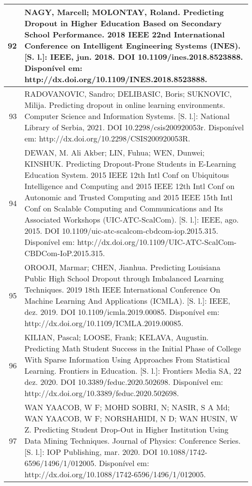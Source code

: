 \begin{apendicesenv}
\begin{longtable}[c]{|r|l|}
92 &
  \multicolumn{1}{p{14.5cm}|}{NAGY, Marcell; MOLONTAY, Roland. Predicting Dropout in Higher Education Based on Secondary School Performance. 2018 IEEE 22nd International Conference on Intelligent Engineering Systems (INES). {[}S. l.{]}: IEEE, jun. 2018. DOI 10.1109/ines.2018.8523888. Disponível em: http://dx.doi.org/10.1109/INES.2018.8523888.} \\ \hline
93 &
  \multicolumn{1}{p{14.5cm}|}{RADOVANOVIC, Sandro; DELIBASIC, Boris; SUKNOVIC, Milija. Predicting dropout in online learning environments. Computer Science and Information Systems. {[}S. l.{]}: National Library of Serbia, 2021. DOI 10.2298/csis200920053r. Disponível em: http://dx.doi.org/10.2298/CSIS200920053R.} \\ \hline
94 &
  \multicolumn{1}{p{14.5cm}|}{DEWAN, M. Ali Akber; LIN, Fuhua; WEN, Dunwei; KINSHUK. Predicting Dropout-Prone Students in E-Learning Education System. 2015 IEEE 12th Intl Conf on Ubiquitous Intelligence and Computing and 2015 IEEE 12th Intl Conf on Autonomic and Trusted Computing and 2015 IEEE 15th Intl Conf on Scalable Computing and Communications and Its Associated Workshops (UIC-ATC-ScalCom). {[}S. l.{]}: IEEE, ago. 2015. DOI 10.1109/uic-atc-scalcom-cbdcom-iop.2015.315. Disponível em: http://dx.doi.org/10.1109/UIC-ATC-ScalCom-CBDCom-IoP.2015.315.} \\ \hline
95 &
  \multicolumn{1}{p{14.5cm}|}{OROOJI, Marmar; CHEN, Jianhua. Predicting Louisiana Public High School Dropout through Imbalanced Learning Techniques. 2019 18th IEEE International Conference On Machine Learning And Applications (ICMLA). {[}S. l.{]}: IEEE, dez. 2019. DOI 10.1109/icmla.2019.00085. Disponível em: http://dx.doi.org/10.1109/ICMLA.2019.00085.} \\ \hline
96 &
  \multicolumn{1}{p{14.5cm}|}{KILIAN, Pascal; LOOSE, Frank; KELAVA, Augustin. Predicting Math Student Success in the Initial Phase of College With Sparse Information Using Approaches From Statistical Learning. Frontiers in Education. {[}S. l.{]}: Frontiers Media SA, 22 dez. 2020. DOI 10.3389/feduc.2020.502698. Disponível em: http://dx.doi.org/10.3389/feduc.2020.502698.} \\ \hline
97 &
  \multicolumn{1}{p{14.5cm}|}{WAN YAACOB, W F; MOHD SOBRI, N; NASIR, S A Md; WAN YAACOB, W F; NORSHAHIDI, N D; WAN HUSIN, W Z. Predicting Student Drop-Out in Higher Institution Using Data Mining Techniques. Journal of Physics: Conference Series. {[}S. l.{]}: IOP Publishing, mar. 2020. DOI 10.1088/1742-6596/1496/1/012005. Disponível em: http://dx.doi.org/10.1088/1742-6596/1496/1/012005.} \\ \hline

\end{longtable}
\end{apendicesenv}
